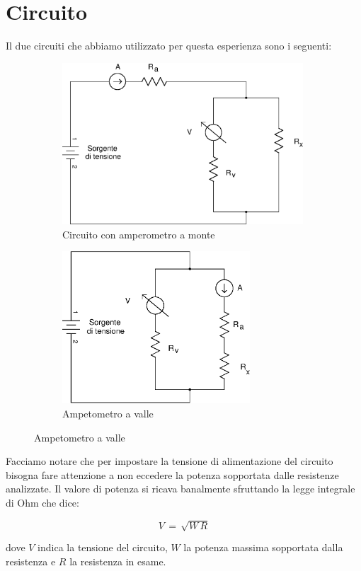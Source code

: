 \section*{Circuito}

Il due circuiti che abbiamo utilizzato per questa esperienza sono i seguenti:

\begin{figure}[h]
  \centering
  \begin{subfigure}[b]{0.50\textwidth}
    \includegraphics[width=9cm]{monte.eps}
    \caption{Circuito con amperometro a monte}
    \label{fig:monte}
  \end{subfigure}
  \qquad
  \begin{subfigure}[b]{0.40\textwidth}
    \includegraphics[width=7cm]{valle.eps}
    \caption{Ampetometro a valle}
    \label{fig:valle}
  \end{subfigure}
\end{figure}

Facciamo notare che per impostare la tensione di alimentazione del circuito bisogna fare attenzione a non eccedere la potenza sopportata dalle resistenze analizzate. Il valore di potenza si ricava banalmente sfruttando la legge integrale di Ohm che dice:

\begin{equation}
	V \,=\, \sqrt{W\,R}
\end{equation}

dove $V$ indica la tensione del circuito, $W$ la potenza massima sopportata dalla resistenza e $R$ la resistenza in esame.




